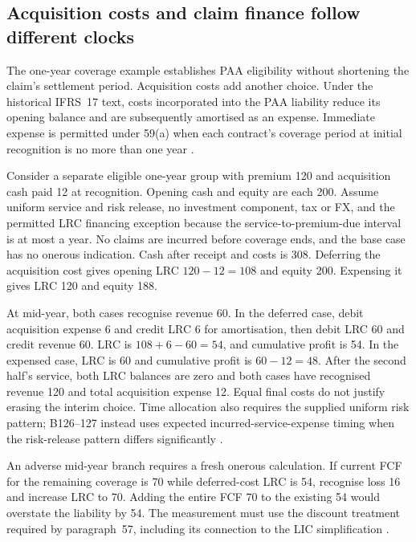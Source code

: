 \subsection{Acquisition costs and claim finance follow different clocks}
\label{sec:insurance-paa-cost-finance}

The one-year coverage example establishes PAA eligibility without shortening
the claim's settlement period. Acquisition costs add another choice. Under
the historical IFRS~17 text, costs incorporated into the PAA liability reduce
its opening balance and are subsequently amortised as an expense. Immediate
expense is permitted under 59(a) when each contract's coverage period at
initial recognition is no more than one year
\citep[IFRS~17.53--59]{eu20231803}.

Consider a separate eligible one-year group with premium 120 and acquisition
cash paid 12 at recognition. Opening cash and equity are each 200. Assume
uniform service and risk release, no investment component, tax or FX, and
the permitted LRC financing exception because the service-to-premium-due
interval is at most a year. No claims are incurred before coverage ends,
and the base case has no onerous indication. Cash after receipt and costs
is 308. Deferring the acquisition cost gives opening LRC \(120-12=108\)
and equity 200. Expensing it gives LRC 120 and equity 188.

At mid-year, both cases recognise revenue 60. In the deferred case, debit
acquisition expense 6 and credit LRC 6 for amortisation, then debit LRC 60
and credit revenue 60. LRC is \(108+6-60=54\), and cumulative profit
is 54. In the expensed case, LRC is 60 and cumulative profit is
\(60-12=48\). After the second half's service, both LRC balances are
zero and both cases have recognised revenue 120 and total acquisition
expense 12. Equal final costs do not justify erasing the interim choice.
Time allocation also requires the supplied uniform risk pattern; B126--127
instead uses expected incurred-service-expense timing when the risk-release
pattern differs significantly \citep[IFRS~17.55,59(a),B126--127]{eu20231803}.

An adverse mid-year branch requires a fresh onerous calculation. If current
FCF for the remaining coverage is 70 while deferred-cost LRC is 54, recognise
loss 16 and increase LRC to 70. Adding the entire FCF 70 to the existing
54 would overstate the liability by 54. The measurement must use the
discount treatment required by paragraph~57, including its connection to
the LIC simplification \citep[IFRS~17.57--58]{eu20231803}.

